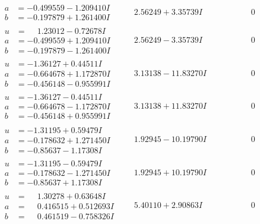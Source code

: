 \documentclass[1p]{elsarticle_modified}
\theoremstyle{definition}
\begin{document}
$$\begin{array}{c|c|c}
\begin{aligned}
a &= -0.499559 - 1.209410 I \\
b &= -0.197879 + 1.261400 I\end{aligned}
 & \phantom{-}2.56249 + 3.35739 I & \phantom{-0.000000 } 0 \\ \hline\begin{aligned}
u &= \phantom{-}1.23012 - 0.72678 I \\
a &= -0.499559 + 1.209410 I \\
b &= -0.197879 - 1.261400 I\end{aligned}
 & \phantom{-}2.56249 - 3.35739 I & \phantom{-0.000000 } 0 \\ \hline\begin{aligned}
u &= -1.36127 + 0.44511 I \\
a &= -0.664678 + 1.172870 I \\
b &= -0.456148 - 0.955991 I\end{aligned}
 & \phantom{-}3.13138 - 11.83270 I & \phantom{-0.000000 } 0 \\ \hline\begin{aligned}
u &= -1.36127 - 0.44511 I \\
a &= -0.664678 - 1.172870 I \\
b &= -0.456148 + 0.955991 I\end{aligned}
 & \phantom{-}3.13138 + 11.83270 I & \phantom{-0.000000 } 0 \\ \hline\begin{aligned}
u &= -1.31195 + 0.59479 I \\
a &= -0.178632 + 1.271450 I \\
b &= -0.85637 - 1.17308 I\end{aligned}
 & \phantom{-}1.92945 - 10.19790 I & \phantom{-0.000000 } 0 \\ \hline\begin{aligned}
u &= -1.31195 - 0.59479 I \\
a &= -0.178632 - 1.271450 I \\
b &= -0.85637 + 1.17308 I\end{aligned}
 & \phantom{-}1.92945 + 10.19790 I & \phantom{-0.000000 } 0 \\ \hline\begin{aligned}
u &= \phantom{-}1.30278 + 0.63648 I \\
a &= \phantom{-}0.416515 + 0.512693 I \\
b &= \phantom{-}0.461519 - 0.758326 I\end{aligned}
 & \phantom{-}5.40110 + 2.90863 I & \phantom{-0.000000 } 0 \\ \hline\begin{aligned}

\end{aligned}
\end{array}$$
\end{document}
